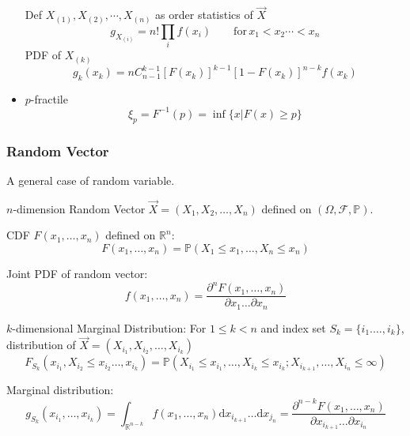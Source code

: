 \begin{itemize}
        Def $X_{(1)},X_{(2)},\cdots,X_{(n)}$ as order statistics of $\vec{X}$
        \begin{equation}    
            g_{X_{(i)}}=n!\prod_i f(x_i)\qquad \mathrm{for}\, x_1<x_2\cdots <x_n    
        \end{equation}
        PDF of $X_{(k)}$
        \begin{equation}    
            g_k(x_k)=nC_{n-1}^{k-1}[F(x_k)]^{k-1}[1-F(x_k)]^{n-k}f(x_k)
        \end{equation}
        \item $p$-fractile
        \begin{equation}    \xi_p=F^{-1}(p)=\inf\{x|F(x)\geq p\}\end{equation}
    \end{itemize}






\subsubsection{Random Vector}
    A general case of random variable.

    $n$-dimension Random Vector $\vec{X}=(X_1,X_2,\ldots,X_n)$ defined on $(\Omega,\mathscr{F},\mathbb{P})$.

    CDF $F(x_1,\ldots,x_n)$ defined on $\mathbb{R}^n$:
    \begin{equation}F(x_1,\ldots,x_n)=\mathbb{P}(X_1\leq x_1,\ldots,X_n\leq x_n)\end{equation}

    Joint PDF of random vector: 
    \begin{equation}
        f(x_1,\ldots,x_n)=\dfrac{\partial^n F(x_1,\ldots,x_n)}{\partial x_1\ldots\partial x_n}
    \end{equation}

    $k$-dimensional Marginal Distribution: For $1\leq k<n$ and index set $S_k=\{i_1.\ldots,i_k\}$, distribution of $\vec{X}=(X_{i_1},X_{i_2},\ldots,X_{i_k})$
    \begin{equation}F_{S_k}(x_{i_1},X_{i_2}\leq x_{i_2}\ldots,x_{i_k})=\mathbb{P}(X_{i_1}\leq x_{i_1},\ldots,X_{i_k}\leq x_{i_k};X_{i_{k+1}},\ldots,X_{i_n}\leq\infty)\end{equation}

    Marginal distribution: 
    \begin{equation}
        g_{S_k}(x_{i_1},\ldots,x_{i_k})=\int_{\mathbb{R}^{n-k}}f(x_1,\ldots,x_n)\mathrm{d}x_{i_{k+1}}\ldots\mathrm{d}x_{j_n}=\dfrac{\partial^{n-k}F(x_1,\ldots,x_n)}{\partial x_{i_{k+1}}\ldots\partial x_{i_n}}
    \end{equation}


